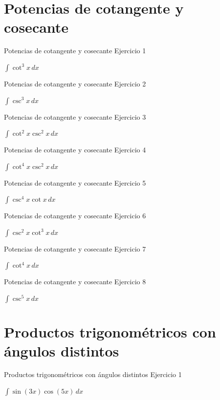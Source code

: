 \documentclass[10pt,aspectratio=169]{beamer}
\newcommand{\ejercicio}[1]{%
  \begin{center}
  \vfill
  {\fontsize{24}{30}\selectfont #1}
  \vfill
  \end{center}
}
\begin{document}
\section{Potencias de cotangente y cosecante}

\begin{frame}{Potencias de cotangente y cosecante}
\small Ejercicio 1
\ejercicio{$\displaystyle \int \cot^3x\,dx$}
\end{frame}

\begin{frame}{Potencias de cotangente y cosecante}
\small Ejercicio 2
\ejercicio{$\displaystyle \int \csc^3x\,dx$}
\end{frame}

\begin{frame}{Potencias de cotangente y cosecante}
\small Ejercicio 3
\ejercicio{$\displaystyle \int \cot^2x\csc^2x\,dx$}
\end{frame}

\begin{frame}{Potencias de cotangente y cosecante}
\small Ejercicio 4
\ejercicio{$\displaystyle \int \cot^4x\csc^2x\,dx$}
\end{frame}

\begin{frame}{Potencias de cotangente y cosecante}
\small Ejercicio 5
\ejercicio{$\displaystyle \int \csc^4x\cot x\,dx$}
\end{frame}

\begin{frame}{Potencias de cotangente y cosecante}
\small Ejercicio 6
\ejercicio{$\displaystyle \int \csc^2x\cot^3x\,dx$}
\end{frame}

\begin{frame}{Potencias de cotangente y cosecante}
\small Ejercicio 7
\ejercicio{$\displaystyle \int \cot^4x\,dx$}
\end{frame}

\begin{frame}{Potencias de cotangente y cosecante}
\small Ejercicio 8
\ejercicio{$\displaystyle \int \csc^5x\,dx$}
\end{frame}

\section{Productos trigonométricos con ángulos distintos}

\begin{frame}{Productos trigonométricos con ángulos distintos}
\small Ejercicio 1
\ejercicio{$\displaystyle \int \sin(3x)\cos(5x)\,dx$}
\end{frame}
\end{document}
